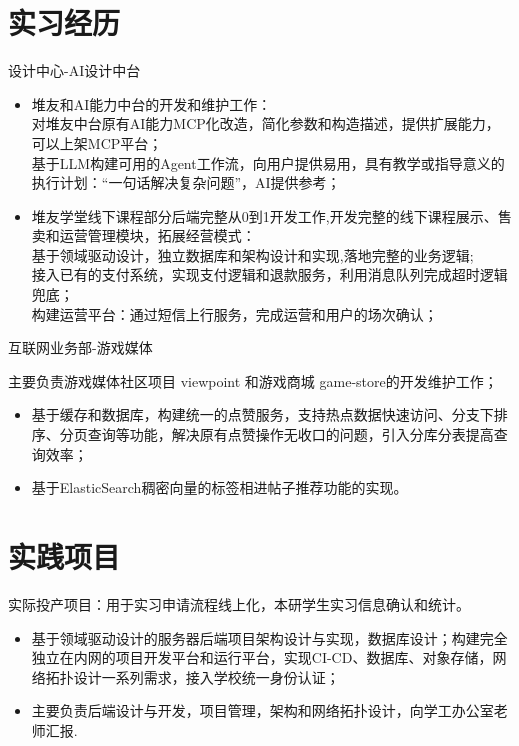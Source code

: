 \documentclass{resume}
\begin{document}
\section{实习经历}
\Content
{{设计中心-AI设计中台}}
{
    \begin{itemize}
        \item 堆友和AI能力中台的开发和维护工作：\\ 对堆友中台原有AI能力MCP化改造，简化参数和构造描述，提供扩展能力，可以上架MCP平台；\\ 基于LLM构建可用的Agent工作流，向用户提供易用，具有教学或指导意义的执行计划：“一句话解决复杂问题”，AI提供参考；
        \item 堆友学堂线下课程部分后端完整从0到1开发工作,开发完整的线下课程展示、售卖和运营管理模块，拓展经营模式：\\
        基于领域驱动设计，独立数据库和架构设计和实现,落地完整的业务逻辑;\\
        接入已有的支付系统，实现支付逻辑和退款服务，利用消息队列完成超时逻辑兜底；\\
        构建运营平台：通过短信上行服务，完成运营和用户的场次确认；
    \end{itemize}
}
\Content
{{互联网业务部-游戏媒体}}
{
    主要负责游戏媒体社区项目 viewpoint 和游戏商城 game-store的开发维护工作；
    \begin{itemize}
        \item 基于缓存和数据库，构建统一的点赞服务，支持热点数据快速访问、分支下排序、分页查询等功能，解决原有点赞操作无收口的问题，引入分库分表提高查询效率；
        \item 基于ElasticSearch稠密向量的标签相进帖子推荐功能的实现。
    \end{itemize}
}

\sepspace

\section{实践项目}
\Contents
{实际投产项目：用于实习申请流程线上化，本研学生实习信息确认和统计。}
{\begin{itemize}
    \item 基于领域驱动设计的服务器后端项目架构设计与实现，数据库设计；构建完全独立在内网的项目开发平台和运行平台，实现CI-CD、数据库、对象存储，网络拓扑设计一系列需求，接入学校统一身份认证；
    \item 主要负责后端设计与开发，项目管理，架构和网络拓扑设计，向学工办公室老师汇报.
\end{itemize}
}
\end{document}
